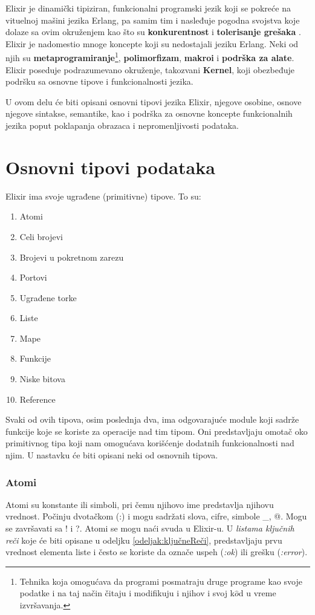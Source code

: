 \documentclass[12pt,oneside]{memoir}
\begin{document}
Elixir je dinamički tipiziran, funkcionalni programski jezik koji se pokreće na vituelnoj mašini jezika Erlang, pa samim tim i nasleđuje pogodna svojstva koje dolaze sa ovim okruženjem kao što su \textbf{konkurentnost} i \textbf{tolerisanje grešaka} \cite{DefinicijaElixira}. Elixir je nadomestio mnoge koncepte koji su nedostajali jeziku Erlang. Neki od njih su  \textbf{metaprogramiranje}\footnote{Tehnika koja omogućava da programi posmatraju druge programe kao svoje podatke i na taj način čitaju i modifikuju i njihov i svoj k$\hat{o}$d u vreme izvršavanja.}, \textbf{polimorfizam}, \textbf{makroi} i \textbf{podrška za alate}. Elixir poseduje podrazumevano okruženje, takozvani \textbf{Kernel}, koji obezbeđuje podršku sa osnovne tipove i funkcionalnosti jezika. 

U ovom delu će biti opisani osnovni tipovi jezika Elixir, njegove osobine, osnove njegove sintakse, semantike, kao i podrška za osnovne koncepte funkcionalnih jezika poput poklapanja obrazaca i nepromenljivosti podataka. 

\newpage

\section{Osnovni tipovi podataka}

Elixir ima svoje ugrađene (primitivne) tipove. To su: 
\begin{enumerate}
\itemsep0em 
    \item {Atomi}
    \item {Celi brojevi}
    \item {Brojevi u pokretnom zarezu}
    \item {Portovi}
    \item {Ugrađene torke}
    \item {Liste}
    \item {Mape}
    \item {Funkcije}
    \item {Niske bitova}
    \item {Reference}
\end{enumerate}

Svaki od ovih tipova, osim poslednja dva, ima odgovarajuće module koji sadrže funkcije koje se koriste za operacije nad tim tipom. Oni predstavljaju omotač oko primitivnog tipa koji nam omogućava korišćenje dodatnih funkcionalnosti nad njim. U nastavku će biti opisani neki od osnovnih tipova.

\subsubsection{Atomi}
Atomi su konstante ili simboli, pri čemu njihovo ime predstavlja njihovu vrednost. Počinju dvotačkom (:) i mogu sadržati slova, cifre, simbole \_, @. Mogu se završavati sa ! i ?. Atomi se mogu naći svuda u Elixir-u. U \textit{listama ključnih reči} koje će biti opisane u odeljku \ref{odeljak:ključneReči}, predstavljaju prvu vrednost elementa liste i često se koriste da označe uspeh (\textit{:ok}) ili grešku (\textit{:error}).
\end{document}
